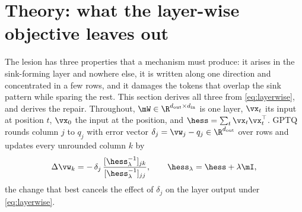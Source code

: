 \section{Theory: what the layer-wise objective leaves out}
\label{sec:mechanism}
The lesion has three properties that a mechanism must produce: it arises in the sink-forming layer and nowhere else, it is written along one direction and concentrated in a few rows, and it damages the tokens that overlap the sink pattern while sparing the rest.
This section derives all three from \cref{eq:layerwise}, and derives the repair.
Throughout, $\mW\in\R^{d_{\mathrm{out}}\times d_{\mathrm{in}}}$ is one layer, $\vx_t$ its input at position $t$, $\vx_0$ the input at the \bos{} position, and $\hess=\sum_t\vx_t\vx_t^\top$.
GPTQ rounds column $j$ to $q_j$ with error vector $\delta_j=\vw_j-q_j\in\R^{d_{\mathrm{out}}}$ over rows and updates every unrounded column $k$ by
\begin{equation}
\label{eq:obs}
\Delta\vw_k=-\,\delta_j\,\frac{[\hess_\lambda^{-1}]_{jk}}{[\hess_\lambda^{-1}]_{jj}},\qquad \hess_\lambda=\hess+\lambda\mI,
\end{equation}
the change that best cancels the effect of $\delta_j$ on the layer output under \cref{eq:layerwise}.

